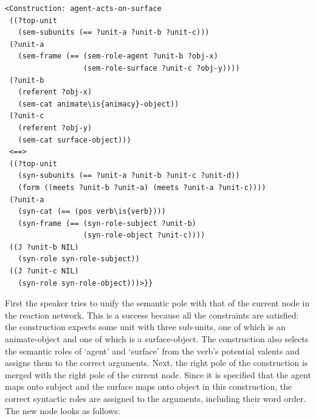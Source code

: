 \noindent\ea
\begin{lstlisting}
<Construction: agent-acts-on-surface
 ((?top-unit
   (sem-subunits (== ?unit-a ?unit-b ?unit-c)))
 (?unit-a
   (sem-frame (== (sem-role-agent ?unit-b ?obj-x)
                  (sem-role-surface ?unit-c ?obj-y))))
 (?unit-b
   (referent ?obj-x)
   (sem-cat animate\is{animacy}-object))
 (?unit-c
   (referent ?obj-y)
   (sem-cat surface-object)))
 <==>
 ((?top-unit
   (syn-subunits (== ?unit-a ?unit-b ?unit-c ?unit-d))
   (form ((meets ?unit-b ?unit-a) (meets ?unit-a ?unit-c))))
 (?unit-a
   (syn-cat (== (pos verb\is{verb})))
   (syn-frame (== (syn-role-subject ?unit-b)
                  (syn-role-object ?unit-c))))
 ((J ?unit-b NIL)
   (syn-role syn-role-subject))
 ((J ?unit-c NIL) 
   (syn-role syn-role-object)))>}}

\end{lstlisting}
\z

First the speaker tries to unify the semantic pole with that of the current node in the reaction network. This is a success because all the constraints are satisfied: the construction expects some unit with three sub-units, one of which is an animate-object and one of which is a surface-object. The construction also selects the semantic roles of `agent' and `surface' from the verb's potential valents and assigns them to the correct arguments. Next, the right pole of the construction is merged with the right pole of the current node. Since it is specified that the agent maps onto subject and the surface maps onto object in this construction, the correct syntactic roles are assigned to the arguments, including their word order. The new node looks as follows:


